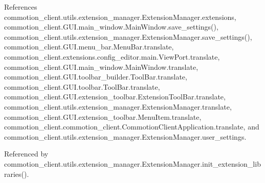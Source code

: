 References commotion\+\_\+client.\+utils.\+extension\+\_\+manager.\+Extension\+Manager.\+extensions, commotion\+\_\+client.\+G\+U\+I.\+main\+\_\+window.\+Main\+Window.\+save\+\_\+settings(), commotion\+\_\+client.\+utils.\+extension\+\_\+manager.\+Extension\+Manager.\+save\+\_\+settings(), commotion\+\_\+client.\+G\+U\+I.\+menu\+\_\+bar.\+Menu\+Bar.\+translate, commotion\+\_\+client.\+extensions.\+config\+\_\+editor.\+main.\+View\+Port.\+translate, commotion\+\_\+client.\+G\+U\+I.\+main\+\_\+window.\+Main\+Window.\+translate, commotion\+\_\+client.\+G\+U\+I.\+toolbar\+\_\+builder.\+Tool\+Bar.\+translate, commotion\+\_\+client.\+G\+U\+I.\+toolbar.\+Tool\+Bar.\+translate, commotion\+\_\+client.\+G\+U\+I.\+extension\+\_\+toolbar.\+Extension\+Tool\+Bar.\+translate, commotion\+\_\+client.\+utils.\+extension\+\_\+manager.\+Extension\+Manager.\+translate, commotion\+\_\+client.\+G\+U\+I.\+extension\+\_\+toolbar.\+Menu\+Item.\+translate, commotion\+\_\+client.\+commotion\+\_\+client.\+Commotion\+Client\+Application.\+translate, and commotion\+\_\+client.\+utils.\+extension\+\_\+manager.\+Extension\+Manager.\+user\+\_\+settings.



Referenced by commotion\+\_\+client.\+utils.\+extension\+\_\+manager.\+Extension\+Manager.\+init\+\_\+extension\+\_\+libraries().


